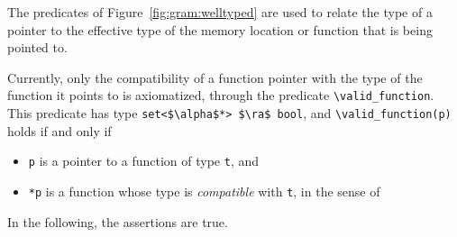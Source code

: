 The predicates of Figure~\ref{fig:gram:welltyped} are used to relate
the type of a pointer to the effective type of the memory location or function
that is being pointed to.

Currently, only the compatibility of a function pointer with the type of
the function it points to is axiomatized, through the predicate
\lstinline|\valid_function|. This predicate has type
\lstinline|set<$\alpha$*> $\ra$ bool|,
and \lstinline|\valid_function(p)| holds if and only if
\begin{itemize}
\item \lstinline|p| is a pointer to a function of type \lstinline|t|, and
\item \lstinline|*p| is a function whose type is \emph{compatible}
  with \lstinline|t|, in the sense of \cite[\S6.2.7]{standardc99}
\end{itemize}

\begin{example}
  In the following, the assertions are true.
\end{example}



%
%


%
%


